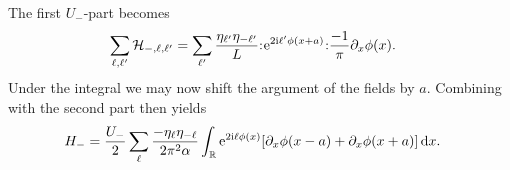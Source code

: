\documentclass[english, parskip=full]{scrartcl}
\begin{document}
The first $U_-$-part becomes
\begin{align}
\sum_{\ell,\ell'} \mathcal{H}_{-,\ell,\ell'} &= \sum_{\ell'} \frac{\eta_{\ell'} \eta_{-\ell'}}{L} {:\mathrel{\mspace{1mu}\text{e}^{2\text{i}\ell'\phi(x+a)}\mspace{1mu}}:}\frac{-1}{\pi} \partial_x\phi(x).
\end{align}
Under the integral we may now shift the argument of the fields by $a$.
Combining with the second part then yields
\begin{align}
H_- &= \frac{U_-}{2} \sum_\ell \frac{ -\eta_\ell \eta_{-\ell}}{2\pi^2\alpha} \intr{  \powe{2\i\ell\phi(x)} \klb*{\partial_x\phi(x-a) + \partial_x\phi(x+a)} }{x}.
\end{align}
\end{document}
